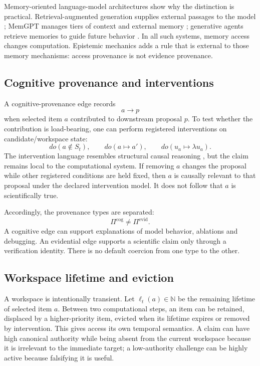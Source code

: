 Memory-oriented language-model architectures show why the distinction is practical. Retrieval-augmented generation supplies external passages to the model \cite{lewis2020}; MemGPT manages tiers of context and external memory \cite{packer2023}; generative agents retrieve memories to guide future behavior \cite{park2023}. In all such systems, memory access changes computation. Epistemic mechanics adds a rule that is external to those memory mechanisms: access provenance is not evidence provenance.

\subsection{Cognitive provenance and interventions}

A cognitive-provenance edge records
\[
a\longrightarrow p
\]
when selected item \(a\) contributed to downstream proposal \(p\). To test whether the contribution is load-bearing, one can perform registered interventions on candidate/workspace state:
\[
do(a\notin S_t),\qquad do(a\mapsto a'),\qquad do(u_a\mapsto\lambda u_a).
\]
The intervention language resembles structural causal reasoning \cite{pearl2009,halpern2016}, but the claim remains local to the computational system. If removing \(a\) changes the proposal while other registered conditions are held fixed, then \(a\) is causally relevant to that proposal under the declared intervention model. It does not follow that \(a\) is scientifically true.

Accordingly, the provenance types are separated:
\[
\Pi^{\mathrm{cog}}\neq\Pi^{\mathrm{evid}}.
\]
A cognitive edge can support explanations of model behavior, ablations and debugging. An evidential edge supports a scientific claim only through a verification identity. There is no default coercion from one type to the other.

\subsection{Workspace lifetime and eviction}

A workspace is intentionally transient. Let \(\ell_t(a)\in\mathbb N\) be the remaining lifetime of selected item \(a\). Between two computational steps, an item can be retained, displaced by a higher-priority item, evicted when its lifetime expires or removed by intervention. This gives access its own temporal semantics. A claim can have high canonical authority while being absent from the current workspace because it is irrelevant to the immediate target; a low-authority challenge can be highly active because falsifying it is useful.


